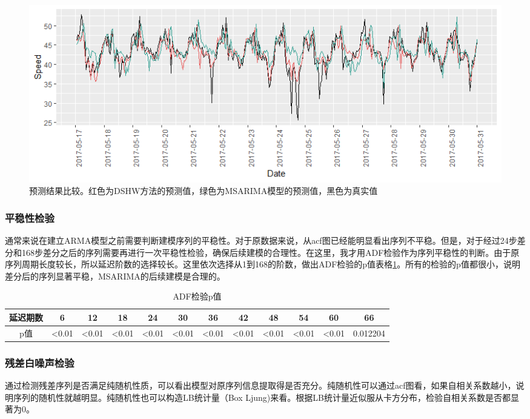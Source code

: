 \documentclass[lang=cn,11pt,a4paper]{elegantpaper}
\begin{document}
\begin{figure}[htbp]
  \centering
  \includegraphics[width=\textwidth]{image/predict.png}
  \caption{预测结果比较。红色为DSHW方法的预测值，绿色为MSARIMA模型的预测值，黑色为真实值}
  \label{fig.8}
\end{figure}  

\subsubsection{平稳性检验}
通常来说在建立ARMA模型之前需要判断建模序列的平稳性。对于原数据来说，从acf图已经能明显看出序列不平稳。但是，对于经过24步差分和168步差分之后的序列需要再进行一次平稳性检验，确保后续建模的合理性。在这里，我才用ADF检验作为序列平稳性的判断。由于原序列周期长度较长，所以延迟阶数的选择较长。这里依次选择从1到168的阶数，做出ADF检验的p值表格\ref{tab:4}。所有的检验的p值都很小，说明差分后的序列显著平稳，MSARIMA的后续建模是合理的。

\begin{table}[H]
\caption{ADF检验p值}
\centering
\label{tab:4}
\begin{tabular}{cccccccccccc}
\hline
延迟期数 & 6 &  12 &  18 &  24 &  30 &  36 &  42 &  48 &  54 &  60 &  66 \\ \hline
p值 & \textless{}0.01 &  \textless{}0.01 &  \textless{}0.01 &  \textless{}0.01 &  \textless{}0.01 &  \textless{}0.01 &  \textless{}0.01 &  \textless{}0.01 &  \textless{}0.01 &  \textless{}0.01 &  0.012204 \\ \hline
\end{tabular}
\end{table}

\subsubsection{残差白噪声检验}
通过检测残差序列是否满足纯随机性质，可以看出模型对原序列信息提取得是否充分。纯随机性可以通过acf图看，如果自相关系数越小，说明序列的随机性就越明显。纯随机性也可以构造LB统计量（Box Ljung)来看。根据LB统计量近似服从卡方分布，检验自相关系数是否都显著为0。
\end{document}
